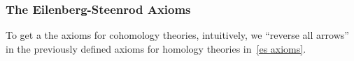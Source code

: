 \documentclass[a4paper,11pt]{article}
\begin{document}


\subsubsection{The Eilenberg-Steenrod Axioms}
To get a the axioms for cohomology theories, intuitively, we \enquote{reverse all arrows} in the previously defined axioms for homology theories in\ \ref{es axioms}.
\end{document}
